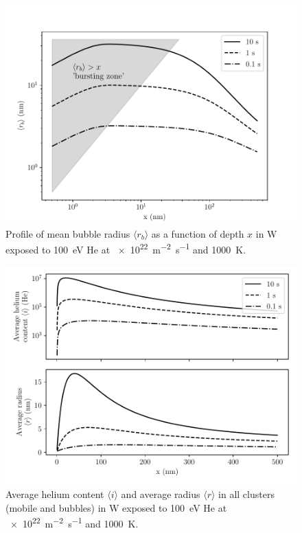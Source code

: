 \begin{figure} [h]
    \centering
    \includegraphics[width=\linewidth]{Figures/Chapter4/half_slab/profile_rb.pdf}
    \caption{Profile of mean bubble radius $\langle r_b \rangle$ as a function of depth $x$ in W exposed to \SI{100}{eV} He at \SI{e22}{m^{-2}.s^{-1}} and \SI{1000}{K}.}
\end{figure}

\begin{figure}
    \centering
    \includegraphics[width=0.75\linewidth]{Figures/Chapter4/half_slab/average_content_radius.pdf}
    \caption{Average helium content $\langle i \rangle$ and average radius $\langle r \rangle$ in all clusters (mobile and bubbles) in W exposed to \SI{100}{eV} He at \SI{e22}{m^{-2}.s^{-1}} and \SI{1000}{K}.}
\end{figure}

